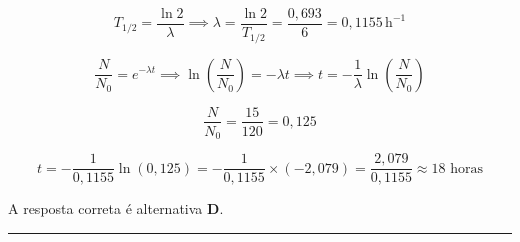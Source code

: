 \documentclass[a4paper,12pt]{article}
\begin{document}
\begin{flushleft}
\[
T_{1/2} = \frac{\ln 2}{\lambda} \implies \lambda = \frac{\ln 2}{T_{1/2}} = \frac{0{,}693}{6} = 0{,}1155\,\mathrm{h}^{-1}
\]

\vspace{0.3cm}


\[
\frac{N}{N_0} = e^{-\lambda t} \implies \ln\left(\frac{N}{N_0}\right) = -\lambda t \implies t = -\frac{1}{\lambda} \ln\left(\frac{N}{N_0}\right)
\]

\vspace{0.3cm}


\[
\frac{N}{N_0} = \frac{15}{120} = 0{,}125
\]

\[
t = -\frac{1}{0{,}1155} \ln(0{,}125) = -\frac{1}{0{,}1155} \times (-2{,}079) = \frac{2{,}079}{0{,}1155} \approx 18 \text{ horas}
\]

\vspace{0.3cm}


A resposta correta é alternativa \colorbox{green!50}{\textbf{D}}.
\end{flushleft}

\noindent\rule{\linewidth}{0.6pt}\\
\end{document}
